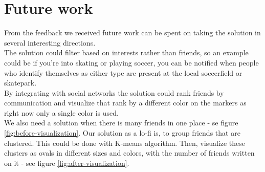 \documentclass[runningheads,a4paper]{llncs}
\begin{document}
\section{Future work} \label{future-work}
From the feedback we received future work can be spent on taking the solution in several interesting directions.\\
The solution could filter based on interests rather than friends, so an example could be if you're into skating or playing soccer, you can be notified when people who identify themselves as either type are present at the local soccerfield or skatepark.\\
By integrating with social networks the solution could rank friends by communication and visualize that rank by a different color on the markers as right now only a single color is used.\\
We also need a solution when there is many friends in one place - se figure \ref{fig:before-visualization}. Our solution as a lo-fi is, to group friends that are clustered. This could be done with K-means algorithm. Then, visualize these clusters as ovals in different sizes and colors, with the number of friends written on it - see figure \ref{fig:after-visualization}. 
\end{document}
